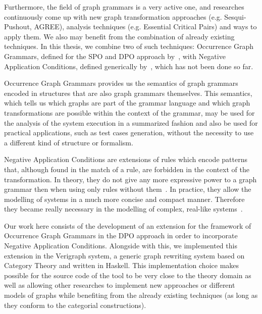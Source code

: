 Furthermore, the field of graph grammars is a very active one, and researches continuously come up with new graph transformation approaches (e.g. Sesqui-Pushout, AGREE), analysis techniques (e.g. Essential Critical Pairs) and ways to apply them. We also may benefit from the combination of already existing techniques. In this thesis, we combine two of such techniques: Occurrence Graph Grammars, defined for the SPO and DPO approach by~\cite{Ribeiro1996, Corradini1996}, with Negative Application Conditions, defined generically by~\cite{Habel1996}, which has not been done so far. 

Occurrence Graph Grammars provides us the semantics of graph grammars encoded in structures that are also graph grammars themselves. This semantics, which tells us which graphs are part of the grammar language and which graph transformations are possible within the context of the grammar, may be used for the analysis of the system execution in a summarized fashion and also be used for practical applications, such as test cases generation, without the necessity to use a different kind of structure or formalism.

Negative Application Conditions are extensions of rules which encode patterns that, although found in the match of a rule, are forbidden in the context of the transformation. In theory, they do not give any more expressive power to a graph grammar then when using only rules without them~\cite{Habel1996}. In practice, they allow the modelling of systems in a much more concise and compact manner. Therefore they became really necessary in the modelling of complex, real-like systems~\cite{Corradini2013, Corradini2014}.

Our work here consists of the development of an extension for the framework of Occurrence Graph Grammars in the DPO approach in order to incorporate Negative Application Conditions. Alongside with this, we implemented this extension in the Verigraph system, a generic graph rewriting system based on Category Theory and written in Haskell. This implementation choice makes possible for the source code of the tool to be very close to the theory domain as well as allowing other researches to implement new approaches or different models of graphs while benefiting from the already existing techniques (as long as they conform to the categorial constructions).


